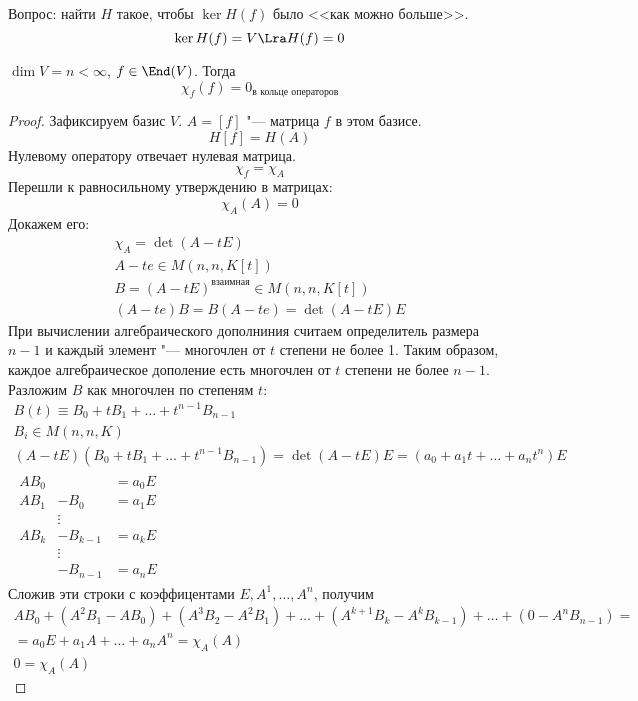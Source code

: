 Вопрос: найти $H$ такое, чтобы $\ker H(f)$ было <<как можно больше>>.
\[ \ker H(f) = V \Lra H(f) = 0 \]
\begin{theorem}
	$\dim V = n < \infty$, $f \in \End(V)$.
	Тогда
	\[ \chi_f(f) = 0_{\text{в кольце операторов}} \]
\end{theorem}
\begin{proof}
	Зафиксируем базис $V$.
	$A = [f]$ "--- матрица $f$ в этом базисе.
	\[ H[f] = H(A) \]
	Нулевому оператору отвечает нулевая матрица.
	\[ \chi_f = \chi_A \]
	Перешли к равносильному утверждению в матрицах:
	\[ \chi_A (A) = 0 \]
	Докажем его:
	\begin{gather*}
		\chi_A = \det (A - tE) \\
		A - te \in M(n, n, K[t]) \\
		B = (A - tE)^{\text{взаимная}} \in M(n, n, K[t]) \\
		(A - te) B = B(A - te) = \det (A - tE) E
	\end{gather*}
	При вычислении алгебраического дополниния считаем определитель размера $n - 1$ и каждый элемент "--- многочлен от $t$ степени не более 1.
	Таким образом, каждое алгебраическое дополение есть многочлен от $t$ степени не более $n - 1$.
	Разложим $B$ как многочлен по степеням $t$:
	\begin{gather*}
		B(t) \equiv B_0 + t B_1 + \dots + t^{n-1} B_{n-1} \\
		B_i \in M(n, n, K) \\
		(A - tE)(B_0 + t B_1 + \dots + t^{n-1} B_{n-1}) = \det (A - tE) E = (a_0 + a_1 t + \dots + a_n t^n) E \\
		\begin{alignedat}{3}
			AB_0 &      &= a_0 E \\
			AB_1 &- B_0 &= a_1 E \\
			&\vdots \\
			AB_k &- B_{k-1} &= a_k E \\
			&\vdots \\
			     &- B_{n-1} &= a_n E
		\end{alignedat}
	\end{gather*}
	Сложив эти строки с коэффицентами $E, A^1, \dots, A^n$, получим
	\begin{gather*}
		AB_0 + (A^2 B_1 - AB_0) + (A^3 B_2 - A^2B_1) + \dots + (A^{k+1} B_k - A^kB_{k-1}) + \dots + (0 - A^nB_{n-1}) = \\
		= a_0 E + a_1 A + \dots + a_n A^n = \chi_A(A) \\
		0 = \chi_A(A)
	\end{gather*}
\end{proof}


